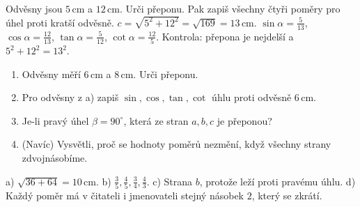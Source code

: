 \documentclass[11pt,a4paper]{article}
\begin{document}
\begin{prikladReseniBox}[title={Příklad 2},breakable=false]
Odvěsny jsou $5\,\mathrm{cm}$ a $12\,\mathrm{cm}$. Urči přeponu.
Pak zapiš všechny čtyři poměry pro úhel proti kratší odvěsně.
\tcblower
$c=\sqrt{5^2+12^2}=\sqrt{169}=13\,\mathrm{cm}$.
$\sin\alpha=\frac5{13}$, $\cos\alpha=\frac{12}{13}$,
$\tan\alpha=\frac5{12}$, $\cot\alpha=\frac{12}5$.
Kontrola: přepona je nejdelší a $5^2+12^2=13^2$.
\end{prikladReseniBox}
\begin{zadaniReseniBox}[title={Samostatná práce 1},breakable=false]
\begin{enumerate}[label=\alph*)]
\item Odvěsny měří $6\,\mathrm{cm}$ a $8\,\mathrm{cm}$. Urči přeponu.
\item Pro odvěsny z a) zapiš $\sin,\cos,\tan,\cot$ úhlu proti odvěsně $6\,\mathrm{cm}$.
\item Je-li pravý úhel $\beta=90^\circ$, která ze stran $a,b,c$ je přeponou?
\item (Navíc) Vysvětli, proč se hodnoty poměrů nezmění, když všechny strany zdvojnásobíme.
\end{enumerate}
\tcblower
a) $\sqrt{36+64}=10\,\mathrm{cm}$.
b) $\frac35,\frac45,\frac34,\frac43$.
c) Strana $b$, protože leží proti pravému úhlu.
d) Každý poměr má v čitateli i jmenovateli stejný násobek $2$, který se zkrátí.
\end{zadaniReseniBox}
\end{document}
